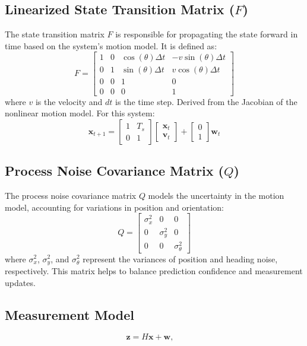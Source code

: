 \documentclass[a4paper,11pt]{article}
\begin{document}
\subsection*{Linearized State Transition Matrix ($F$)}
The state transition matrix $F$ is responsible for propagating the state forward in time based on the system's motion model. It is defined as:
\begin{equation*}
    F =
    \begin{bmatrix}
        1 & 0 & \cos(\theta)\Delta t & -v \sin(\theta)\Delta t \\
        0 & 1 & \sin(\theta)\Delta t & v \cos(\theta)\Delta t \\
        0 & 0 & 1 & 0 \\
        0 & 0 & 0 & 1
    \end{bmatrix}
\end{equation*}
where $v$ is the velocity and $dt$ is the time step.
Derived from the Jacobian of the nonlinear motion model.
For this system:
\[
\mathbf{x}_{t+1} = 
\begin{bmatrix}
1 & T_s \\
0 & 1
\end{bmatrix} \begin{bmatrix}
   \mathbf{x}_t \\ \mathbf{v}_{t} 
\end{bmatrix}
 +
\begin{bmatrix}
0 \\
1
\end{bmatrix}
\mathbf{w}_{t}
\]

\subsection*{Process Noise Covariance Matrix ($Q$)}
The process noise covariance matrix $Q$ models the uncertainty in the motion model, accounting for variations in position and orientation:
\begin{equation}
Q = \begin{bmatrix}
\sigma_x^2 & 0 & 0 \\
0 & \sigma_y^2 & 0 \\
0 & 0 & \sigma_\theta^2
\end{bmatrix}
\end{equation}
where $\sigma_x^2$, $\sigma_y^2$, and $\sigma_\theta^2$ represent the variances of position and heading noise, respectively. This matrix helps to balance prediction confidence and measurement updates.

\subsection*{Measurement Model}
\begin{equation*}
    \mathbf{z} = H\mathbf{x} + \mathbf{w}, \quad 
    \end{equation*}
\end{document}
